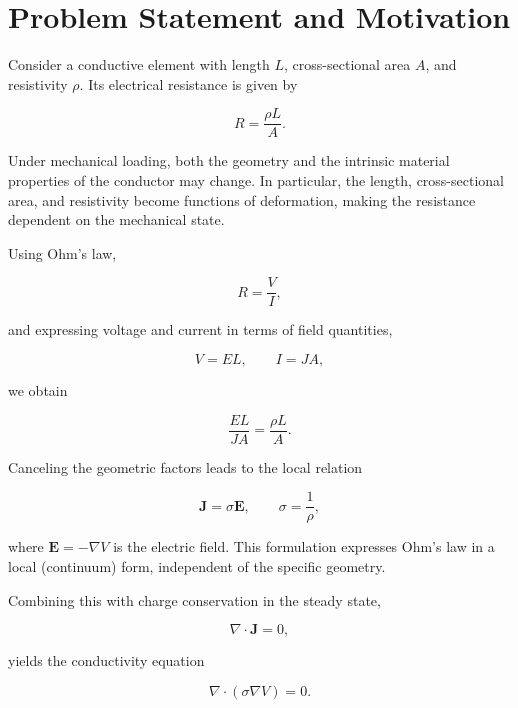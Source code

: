 
\section{Problem Statement and Motivation}

Consider a conductive element with length $L$, cross-sectional area $A$, and resistivity $\rho$. 
Its electrical resistance is given by

\begin{equation}
    R = \frac{\rho L}{A}.
\end{equation}

Under mechanical loading, both the geometry and the intrinsic material properties of the conductor may change. 
In particular, the length, cross-sectional area, and resistivity become functions of deformation, 
making the resistance dependent on the mechanical state.

Using Ohm's law,

\begin{equation}
    R = \frac{V}{I},
\end{equation}

and expressing voltage and current in terms of field quantities,

\begin{equation}
    V = EL, \qquad I = JA,
\end{equation}

we obtain

\begin{equation}
    \frac{EL}{JA} = \frac{\rho L}{A}.
\end{equation}

Canceling the geometric factors leads to the local relation

\begin{equation}
    \mathbf{J} = \sigma \mathbf{E}, \qquad \sigma = \frac{1}{\rho},
\end{equation}

where $\mathbf{E} = -\nabla V$ is the electric field. 
This formulation expresses Ohm’s law in a local (continuum) form, independent of the specific geometry.

Combining this with charge conservation in the steady state,

\begin{equation}
    \nabla \cdot \mathbf{J} = 0,
\end{equation}

yields the conductivity equation

\begin{equation}
    \nabla \cdot (\sigma \nabla V) = 0.
\end{equation}

